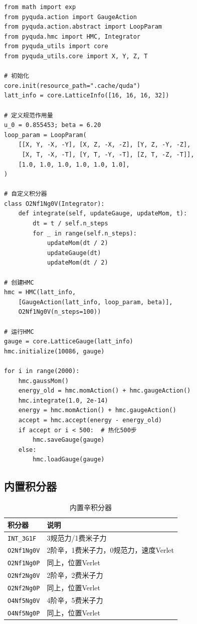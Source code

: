\documentclass[12pt,a4paper]{ctexart}
\begin{document}
\begin{lstlisting}[caption={淬火HMC示例}, label={lst:hmc_example}]
from math import exp
from pyquda.action import GaugeAction
from pyquda.action.abstract import LoopParam
from pyquda.hmc import HMC, Integrator
from pyquda_utils import core
from pyquda_utils.core import X, Y, Z, T

# 初始化
core.init(resource_path=".cache/quda")
latt_info = core.LatticeInfo([16, 16, 16, 32])

# 定义规范作用量
u_0 = 0.855453; beta = 6.20
loop_param = LoopParam(
    [[X, Y, -X, -Y], [X, Z, -X, -Z], [Y, Z, -Y, -Z],
     [X, T, -X, -T], [Y, T, -Y, -T], [Z, T, -Z, -T]],
    [1.0, 1.0, 1.0, 1.0, 1.0, 1.0],
)

# 自定义积分器
class O2Nf1Ng0V(Integrator):
    def integrate(self, updateGauge, updateMom, t):
        dt = t / self.n_steps
        for _ in range(self.n_steps):
            updateMom(dt / 2)
            updateGauge(dt)
            updateMom(dt / 2)

# 创建HMC
hmc = HMC(latt_info,
    [GaugeAction(latt_info, loop_param, beta)],
    O2Nf1Ng0V(n_steps=100))

# 运行HMC
gauge = core.LatticeGauge(latt_info)
hmc.initialize(10086, gauge)

for i in range(2000):
    hmc.gaussMom()
    energy_old = hmc.momAction() + hmc.gaugeAction()
    hmc.integrate(1.0, 2e-14)
    energy = hmc.momAction() + hmc.gaugeAction()
    accept = hmc.accept(energy - energy_old)
    if accept or i < 500:  # 热化500步
        hmc.saveGauge(gauge)
    else:
        hmc.loadGauge(gauge)
\end{lstlisting}

\subsection{内置积分器}

\begin{table}[H]
\centering
\caption{内置辛积分器}
\label{tab:integrators}
\begin{tabular}{@{}ll@{}}
\toprule
\textbf{积分器} & \textbf{说明} \\
\midrule
\texttt{INT\_3G1F} & 3规范力/1费米子力 \\
\texttt{O2Nf1Ng0V} & 2阶辛，1费米子力，0规范力，速度Verlet \\
\texttt{O2Nf1Ng0P} & 同上，位置Verlet \\
\texttt{O2Nf2Ng0V} & 2阶辛，2费米子力 \\
\texttt{O2Nf2Ng0P} & 同上，位置Verlet \\
\texttt{O4Nf5Ng0V} & 4阶辛，5费米子力 \\
\texttt{O4Nf5Ng0P} & 同上，位置Verlet \\
\bottomrule
\end{tabular}
\end{table}
\end{document}
